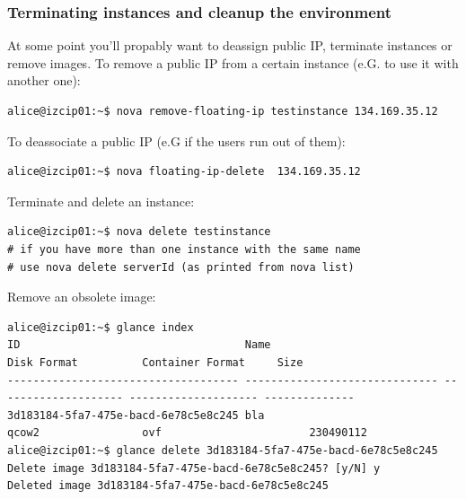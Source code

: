 \documentclass[a4paper,bibtotoc,english,liststotoc]{scrartcl}
\begin{document}
\subsubsection{Terminating instances and cleanup the environment}
At some point you'll propably want to deassign public IP, terminate
instances or remove images.
To remove a public IP from a certain instance (e.G. to use it with
another one):
\begin{verbatim}
alice@izcip01:~$ nova remove-floating-ip testinstance 134.169.35.12
\end{verbatim}
To deassociate a public IP (e.G if the users run out of them):
\begin{verbatim}
alice@izcip01:~$ nova floating-ip-delete  134.169.35.12
\end{verbatim}
Terminate and delete an instance:
\begin{verbatim}
alice@izcip01:~$ nova delete testinstance
# if you have more than one instance with the same name 
# use nova delete serverId (as printed from nova list)
\end{verbatim}
Remove an obsolete image:
\begin{verbatim}
alice@izcip01:~$ glance index
ID                                   Name                           Disk Format          Container Format     Size          
------------------------------------ ------------------------------ -------------------- -------------------- --------------
3d183184-5fa7-475e-bacd-6e78c5e8c245 bla                            qcow2                ovf                       230490112
alice@izcip01:~$ glance delete 3d183184-5fa7-475e-bacd-6e78c5e8c245
Delete image 3d183184-5fa7-475e-bacd-6e78c5e8c245? [y/N] y
Deleted image 3d183184-5fa7-475e-bacd-6e78c5e8c245
\end{verbatim}
\end{document}
